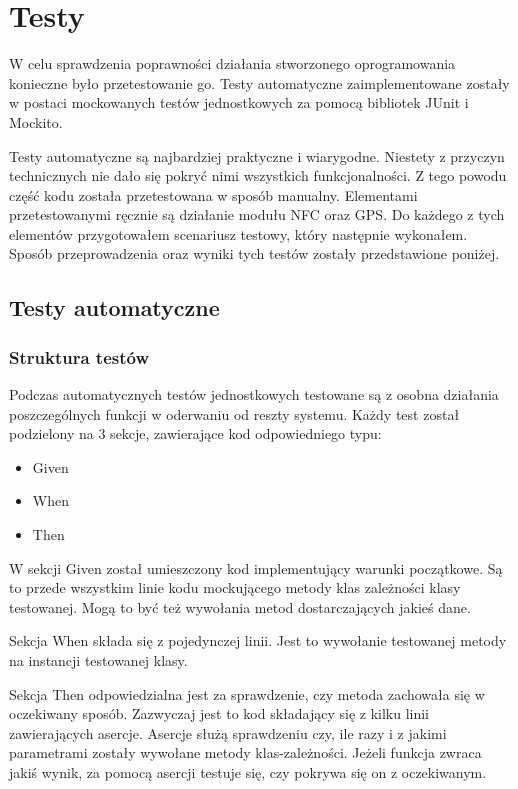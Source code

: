 \documentclass[openright]{xmgr}
\begin{document}
\chapter{Testy} 

W celu sprawdzenia poprawności działania stworzonego oprogramowania konieczne było przetestowanie go.  Testy automatyczne zaimplementowane zostały w postaci mockowanych testów jednostkowych za pomocą bibliotek JUnit i Mockito.

Testy automatyczne są najbardziej praktyczne i wiarygodne. Niestety z przyczyn technicznych nie dało się pokryć nimi wszystkich funkcjonalności. Z tego powodu część kodu została przetestowana w sposób manualny. Elementami przetestowanymi ręcznie są działanie modułu NFC oraz GPS. Do każdego z tych elementów przygotowałem scenariusz testowy, który następnie wykonałem. Sposób przeprowadzenia oraz wyniki tych testów zostały przedstawione poniżej.

\section{Testy automatyczne}
\subsection{Struktura testów}
Podczas  automatycznych testów jednostkowych testowane są z osobna działania poszczególnych funkcji w oderwaniu od reszty systemu. Każdy test został podzielony na 3 sekcje, zawierające kod odpowiedniego typu:
\begin{itemize}
\item Given
\item When
\item Then
\end{itemize}

W sekcji Given został umieszczony kod implementujący warunki początkowe. Są to przede wszystkim linie kodu mockującego metody klas zależności klasy testowanej. Mogą to być też wywołania metod dostarczających jakieś dane. 

Sekcja When składa się z pojedynczej linii. Jest to wywołanie testowanej metody na instancji testowanej klasy.

Sekcja Then odpowiedzialna jest za sprawdzenie, czy metoda zachowała się w oczekiwany sposób. Zazwyczaj jest to kod składający się z kilku linii zawierających asercje. Asercje służą sprawdzeniu czy, ile razy i z jakimi parametrami zostały wywołane metody klas-zależności. Jeżeli funkcja zwraca jakiś wynik, za pomocą asercji testuje się, czy pokrywa się on z oczekiwanym.
\end{document}
